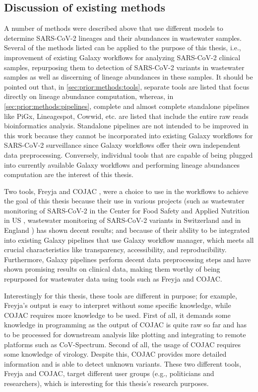     \subsection{Discussion of existing methods} \label{sec:prior:discussion}
    A number of methods were described above that use different models to determine SARS-CoV-2 lineages and their abundances in wastewater samples. Several of the methods listed can be applied to the purpose of this thesis, i.e., improvement of existing Galaxy workflows for analyzing SARS-CoV-2 clinical samples, repurposing them to detection of SARS-CoV-2 variants in wastewater samples as well as discerning of lineage abundances in these samples. It should be pointed out that, in \cref{sec:prior:methods:tools}, separate tools are listed that focus directly on lineage abundance computation, whereas, in \cref{sec:prior:methods:pipelines}, complete and almost complete standalone pipelines like PiGx, Lineagespot, Cowwid, etc. are listed that include the entire raw reads bioinformatics analysis. Standalone pipelines are not intended to be improved in this work because they cannot be incorporated into existing Galaxy workflows for SARS-CoV-2 surveillance since Galaxy workflows offer their own independent data preprocessing. Conversely, individual tools that are capable of being plugged into currently available Galaxy workflows and performing lineage abundances computation are the interest of this thesis.

    Two tools, Freyja \cite{joshuailevy2022,karthikeyan2022} and COJAC \cite{jahn2021}, were a choice to use in the workflows to achieve the goal of this thesis because their use in various projects (such as wastewater monitoring of SARS-CoV-2 in the Center for Food Safety and Applied Nutrition in US \cite{nutrition2022}, wastewater monitoring of SARS-CoV-2 variants in Switzerland \cite{jahn2022} and in England \cite{jbc}) has shown decent results; and because of their ability to be integrated into existing Galaxy pipelines that use Galaxy workflow manager, which meets all crucial characteristics like transparency, accessibility, and reproducibility. Furthermore, Galaxy pipelines perform decent data preprocessing steps and have shown promising results on clinical data, making them worthy of being repurposed for wastewater data using tools such as Freyja and COJAC. 
    
    Interestingly for this thesis, these tools are different in purpose; for example, Freyja’s output is easy to interpret without some specific knowledge, while COJAC requires more knowledge to be used. First of all, it demands some knowledge in programming as the output of COJAC is quite raw so far and has to be processed for downstream analysis like plotting and integrating to remote platforms such as CoV-Spectrum. Second of all, the usage of COJAC requires some knowledge of virology. Despite this, COJAC provides more detailed information and is able to detect unknown variants. These two different tools, Freyja and COJAC, target different user groups (e.g., politicians and researchers), which is interesting for this thesis's research purposes.
    